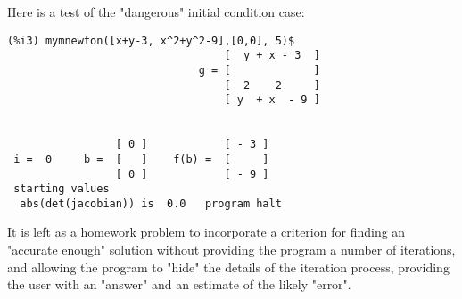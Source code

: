 \documentclass[12pt]{article}
\begin{document}
\normalsize
\newpage
Here is a test of the "dangerous" initial condition case:
\small
\begin{verbatim}
(%i3) mymnewton([x+y-3, x^2+y^2-9],[0,0], 5)$
                                  [  y + x - 3  ]
                              g = [             ]
                                  [  2    2     ]
                                  [ y  + x  - 9 ]

   
                 [ 0 ]            [ - 3 ]
 i =  0     b =  [   ]    f(b) =  [     ] 
                 [ 0 ]            [ - 9 ]
 starting values  
  abs(det(jacobian)) is  0.0   program halt  
\end{verbatim}
\normalsize
It is left as a homework problem to incorporate a criterion for finding an 
  "accurate enough" solution without providing the program a number of 
  iterations, and allowing the program to "hide" the details of the iteration process,
  providing the user with an "answer" and an estimate of the likely "error".
\end{document}
